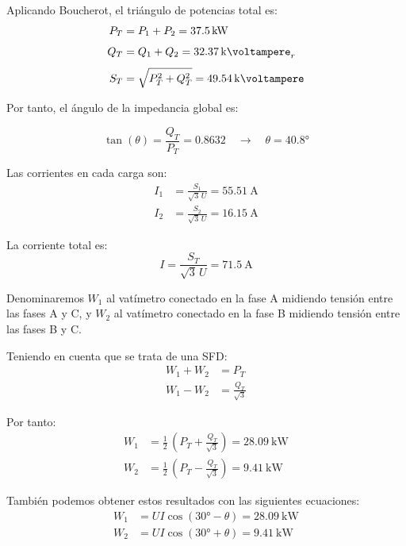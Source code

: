 \vspace{5mm}
 Aplicando Boucherot, el triángulo de potencias total es:
 \begin{align*}
   P_T &= P_1 + P_2 = \SI{37.5}{\kilo\watt}\\[4pt]
   Q_T &= Q_1 + Q_2 = \SI{32.37}{\kilo\voltampere}_r\\[4pt]
   S_T &= \sqrt{P_T^2 + Q_T^2} = \SI{49.54}{\kilo\voltampere}
 \end{align*}

\vspace{2mm}
 Por tanto, el ángulo de la impedancia global es:

\[
  \tan(\theta) = \frac{Q_T}{P_T} = 0.8632 \quad \rightarrow \quad \theta =
  \ang{40.8}
\]

\vspace{2mm}
Las corrientes en cada carga son:
\begin{align*}
  I_1 &= \frac{S_1}{\sqrt{3} \,U} = \SI{55.51}{\ampere}\\
  I_2 &= \frac{S_2}{\sqrt{3} \,U} = \SI{16.15}{\ampere}
\end{align*}

La corriente total es:
\[
  I = \frac{S_T}{{\sqrt{3} \,U}} = \SI{71.5}{\ampere}
\]

\vspace{4mm}
Denominaremos $W_1$ al vatímetro conectado en la fase A midiendo
tensión entre las fases A y C, y $W_2$ al vatímetro conectado en
la fase B midiendo tensión entre las fases B y C. 

\vspace{2mm}
Teniendo en cuenta
que se trata de una SFD: 
\begin{align*}
  W_1 + W_2 &= P_T\\[3pt]
  W_1 - W_2 &= \frac{Q_T}{\sqrt{3}}
\end{align*}

Por tanto:
\begin{align*}
  W_1 &= \frac{1}{2} \, \left(P_T + \frac{Q_T}{\sqrt{3}} \right) = \SI{28.09}{\kilo\watt}\\[3pt]
  W_2 &= \frac{1}{2} \, \left(P_T - \frac{Q_T}{\sqrt{3}} \right) = \SI{9.41}{\kilo\watt}
\end{align*}

También podemos obtener estos resultados con las siguientes ecuaciones:
\begin{align*}
  W_1 &= U I \cos(\ang{30} - \theta) = \SI{28.09}{\kilo\watt}\\[3pt]
  W_2 &= U I \cos(\ang{30} + \theta) = \SI{9.41}{\kilo\watt}
\end{align*}

